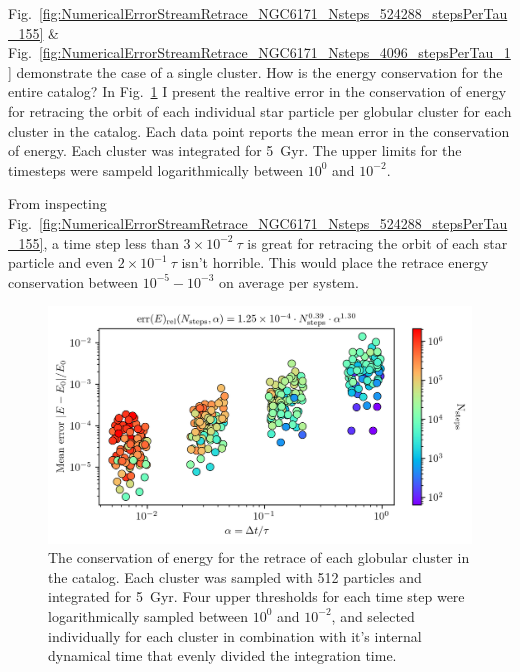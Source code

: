         Fig.~\ref{fig:NumericalErrorStreamRetrace_NGC6171_Nsteps_524288_stepsPerTau_155} \& Fig.~\ref{fig:NumericalErrorStreamRetrace_NGC6171_Nsteps_4096_stepsPerTau_1} demonstrate the case of a single cluster. How is the energy conservation for the entire catalog? In Fig.~\ref{fig:NumericalErrorStreamRetraceEnergyConservation} I present the realtive error in the conservation of energy for retracing the orbit of each individual star particle per globular cluster for each cluster in the catalog. Each data point reports the mean error in the conservation of energy. Each cluster was integrated for 5~Gyr. The upper limits for the timesteps were sampeld logarithmically between $10^{0}$ and $10^{-2}$. 

        From inspecting Fig.~\ref{fig:NumericalErrorStreamRetrace_NGC6171_Nsteps_524288_stepsPerTau_155}, a time step less than $3\times10^{-2}~\tau$ is great for retracing the orbit of each star particle and even $2\times10^{-1}~\tau$ isn't horrible. This would place the retrace energy conservation between $10^{-5}-10^{-3}$ on average per system. 

        \begin{figure}
            \centering 
            \includegraphics[width=\linewidth]{images/NumericalErrorStreamRetraceEnergyConservation.png}
            \caption{The conservation of energy for the retrace of each globular cluster in the catalog. Each cluster was sampled with 512 particles and integrated for 5~Gyr. Four upper thresholds for each time step were logarithmically sampled between $10^{0}$ and $10^{-2}$, and selected individually for each cluster in combination with it's internal dynamical time that evenly divided the integration time. }
            \label{fig:NumericalErrorStreamRetraceEnergyConservation}
        \end{figure}

